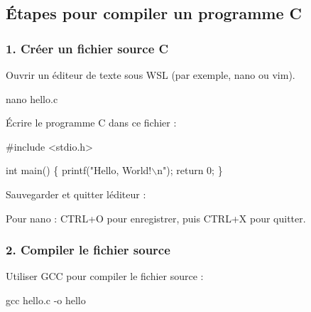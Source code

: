 \subsection*{Étapes pour compiler un programme C}

\subsubsection*{1. Créer un fichier source C}


\begin{DoxyEnumerate}
\item Ouvrir un éditeur de texte sous W\+SL (par exemple, {\ttfamily nano} ou {\ttfamily vim}). 
\begin{DoxyCode}
nano hello.c
\end{DoxyCode}

\item Écrire le programme C dans ce fichier \+:
\end{DoxyEnumerate}


\begin{DoxyCode}
#include <stdio.h>

int main() \{
      printf("Hello, World!\(\backslash\)n");
      return 0;
\}
\end{DoxyCode}



\begin{DoxyEnumerate}
\item Sauvegarder et quitter l\textquotesingle{}éditeur \+:
\begin{DoxyItemize}
\item Pour {\ttfamily nano} \+: {\ttfamily C\+T\+R\+L+O} pour enregistrer, puis {\ttfamily C\+T\+R\+L+X} pour quitter.
\end{DoxyItemize}
\end{DoxyEnumerate}

\subsubsection*{2. Compiler le fichier source}


\begin{DoxyEnumerate}
\item Utiliser G\+CC pour compiler le fichier source \+:
\end{DoxyEnumerate}


\begin{DoxyCode}
gcc hello.c -o hello
\end{DoxyCode}



